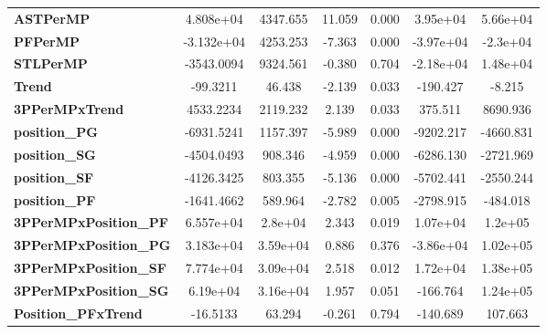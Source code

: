 \begin{center}
\begin{tabular}{lcccccc}
\textbf{ASTPerMP}                   &    4.808e+04  &     4347.655     &    11.059  &         0.000        &     3.95e+04    &     5.66e+04     \\
\textbf{PFPerMP}                    &   -3.132e+04  &     4253.253     &    -7.363  &         0.000        &    -3.97e+04    &     -2.3e+04     \\
\textbf{STLPerMP}                   &   -3543.0094  &     9324.561     &    -0.380  &         0.704        &    -2.18e+04    &     1.48e+04     \\
\textbf{Trend}                      &     -99.3211  &       46.438     &    -2.139  &         0.033        &     -190.427    &       -8.215     \\
\textbf{3PPerMPxTrend}              &    4533.2234  &     2119.232     &     2.139  &         0.033        &      375.511    &     8690.936     \\
\textbf{position\_PG}               &   -6931.5241  &     1157.397     &    -5.989  &         0.000        &    -9202.217    &    -4660.831     \\
\textbf{position\_SG}               &   -4504.0493  &      908.346     &    -4.959  &         0.000        &    -6286.130    &    -2721.969     \\
\textbf{position\_SF}               &   -4126.3425  &      803.355     &    -5.136  &         0.000        &    -5702.441    &    -2550.244     \\
\textbf{position\_PF}               &   -1641.4662  &      589.964     &    -2.782  &         0.005        &    -2798.915    &     -484.018     \\
\textbf{3PPerMPxPosition\_PF}       &    6.557e+04  &      2.8e+04     &     2.343  &         0.019        &     1.07e+04    &      1.2e+05     \\
\textbf{3PPerMPxPosition\_PG}       &    3.183e+04  &     3.59e+04     &     0.886  &         0.376        &    -3.86e+04    &     1.02e+05     \\
\textbf{3PPerMPxPosition\_SF}       &    7.774e+04  &     3.09e+04     &     2.518  &         0.012        &     1.72e+04    &     1.38e+05     \\
\textbf{3PPerMPxPosition\_SG}       &     6.19e+04  &     3.16e+04     &     1.957  &         0.051        &     -166.764    &     1.24e+05     \\
\textbf{Position\_PFxTrend}         &     -16.5133  &       63.294     &    -0.261  &         0.794        &     -140.689    &      107.663     \\

\end{tabular}
\end{center}
